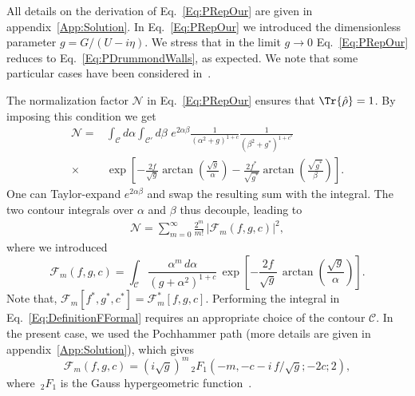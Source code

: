 All details on the derivation of Eq.~\eqref{Eq:PRepOur} are given in appendix~\ref{App:Solution}.
In Eq.~\eqref{Eq:PRepOur} we introduced the dimensionless parameter \mbox{$g=G/(U-i\eta)$}.
We stress that in the limit $g\to0$ Eq.~\eqref{Eq:PRepOur} reduces to Eq.~\eqref{Eq:PDrummondWalls}, as expected. We note that some particular cases have been considered in~\cite{KryuchkyanOC96,MeaneyEPJQT14,ElliottarXiv16}.

The normalization factor ${\mathcal{N}}$ in Eq.~\eqref{Eq:PRepOur} ensures that $\Tr{\hat{\rho}}=1$.
By imposing this condition we get
\begin{align}
{\mathcal{N}}=&
\int_\mathcal{C}\!\!d\alpha \int_{\mathcal{C}'}\!\!d\beta\,\,
e^{2\alpha\beta} \frac{1}{\left(\alpha^2+g\right)^{1+c}}
\frac{1}{\left(\beta^2+g^*\right)^{1+c^*}}
\nonumber\\
\times&\exp\left[-\frac{2f}{\sqrt{g}}\arctan\left(\frac{\sqrt{g}}{\alpha}\right)
-\frac{2f^*}{\sqrt{g^*}}\arctan\left(\frac{\sqrt{g^*}}{\beta}\right)\right].
\end{align}
One can Taylor-expand $e^{2\alpha\beta}$ and swap the resulting sum with the integral.
The two contour integrals over $\alpha$ and $\beta$ thus decouple, leading to
\begin{align}\label{Eq:Normalization}
{\mathcal{N}}=\sum_{m=0}^{\infty} \frac{2^m}{m!}\, \left|{\mathcal{F}}_m\left(f,g,c\right)\right|^2,
\end{align}
where we introduced
\begin{equation}\label{Eq:DefinitionFFormal}
{\mathcal{F}}_m\left(f,g,c\right)=\!\!\int_\mathcal{\!C} 
\frac{\alpha^m\, d\alpha}{\left(g+\alpha^2\right)^{1+c}}\,
\exp\left[
-\frac{2f}{\sqrt{g}}\,\arctan\left(\frac{\sqrt{g}}{\alpha}\right)
\right]\!.
\end{equation}
Note that, ${\mathcal{F}}_m\left[f^*,g^*,c^*\right]={\mathcal{F}}_m^*\left[f,g,c\right]$.
Performing the integral in Eq.~\eqref{Eq:DefinitionFFormal} requires an appropriate choice
of the contour $\mathcal{C}$.
In the present case, we used the Pochhammer path (more details are given in appendix~\ref{App:Solution}), which gives
\begin{equation}
\label{Eq:FormulaFcomplete}
{\mathcal{F}}_m\left(f,g,c\right)=\left(i\sqrt{g}\right)^m
\,_2 F_1\left(-m,-c-i\,f/\sqrt{g};-2c;2\right),
\end{equation}
where $\,_2 F_1$ is the Gauss hypergeometric function~\cite{BaileyBOOK}.


